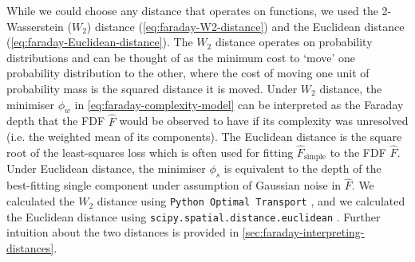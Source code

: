     While we could choose any distance that operates on functions, we used the 2-Wasserstein ($W_2$) distance (\autoref{eq:faraday-W2-distance}) and the Euclidean distance (\autoref{eq:faraday-Euclidean-distance}). The $W_2$ distance operates on probability distributions and can be thought of as the minimum cost to `move' one probability distribution to the other, where the cost of moving one unit of probability mass is the squared distance it is moved. Under $W_2$ distance, the minimiser $\phi_w$ in \autoref{eq:faraday-complexity-model} can be interpreted as the Faraday depth that the FDF $\hat F$ would be observed to have if its complexity was unresolved (i.e. the weighted mean of its components). The Euclidean distance is the square root of the least-squares loss which is often used for fitting $\hat{F}_{\mathrm{simple}}$ to the FDF $\hat F$. Under Euclidean distance, the minimiser $\phi_s$ is equivalent to the depth of the best-fitting single component under assumption of Gaussian noise in $\hat F$.
    We calculated the $W_2$ distance using \texttt{Python Optimal Transport} \citep{flamary17pot}, and we calculated the Euclidean distance using \texttt{scipy.spatial.distance.euclidean} \citep{virtanen20scipy}.
    Further intuition about the two distances is provided in \autoref{sec:faraday-interpreting-distances}.


